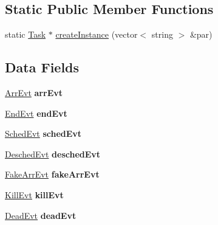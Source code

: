 \begin{DoxyCompactItemize}
\end{DoxyCompactItemize}
\subsection*{Static Public Member Functions}
\begin{DoxyCompactItemize}
\item 
static \hyperlink{classRTSim_1_1Task}{Task} $\ast$ \hyperlink{classRTSim_1_1Task_a58f3f4be461cc1347f60892675326b88}{create\+Instance} (vector$<$ string $>$ \&par)
\end{DoxyCompactItemize}
\subsection*{Data Fields}
\begin{DoxyCompactItemize}
\item 
\hyperlink{classRTSim_1_1ArrEvt}{Arr\+Evt} {\bfseries arr\+Evt}\hypertarget{classRTSim_1_1Task_a23466c1947d46a0bd6e4f602ff2ea209}{}\label{classRTSim_1_1Task_a23466c1947d46a0bd6e4f602ff2ea209}

\item 
\hyperlink{classRTSim_1_1EndEvt}{End\+Evt} {\bfseries end\+Evt}\hypertarget{classRTSim_1_1Task_a80b42caf7fec71180433321d1f7899fb}{}\label{classRTSim_1_1Task_a80b42caf7fec71180433321d1f7899fb}

\item 
\hyperlink{classRTSim_1_1SchedEvt}{Sched\+Evt} {\bfseries sched\+Evt}\hypertarget{classRTSim_1_1Task_a7d241ee11ec1b49e31da028238d26133}{}\label{classRTSim_1_1Task_a7d241ee11ec1b49e31da028238d26133}

\item 
\hyperlink{classRTSim_1_1DeschedEvt}{Desched\+Evt} {\bfseries desched\+Evt}\hypertarget{classRTSim_1_1Task_a465061168fb43b65122da9adabec47fb}{}\label{classRTSim_1_1Task_a465061168fb43b65122da9adabec47fb}

\item 
\hyperlink{classRTSim_1_1FakeArrEvt}{Fake\+Arr\+Evt} {\bfseries fake\+Arr\+Evt}\hypertarget{classRTSim_1_1Task_a3a565a492844186590398ce81b354fa8}{}\label{classRTSim_1_1Task_a3a565a492844186590398ce81b354fa8}

\item 
\hyperlink{classRTSim_1_1KillEvt}{Kill\+Evt} {\bfseries kill\+Evt}\hypertarget{classRTSim_1_1Task_a36198ed8f16c8e3f8551fe5660b57d17}{}\label{classRTSim_1_1Task_a36198ed8f16c8e3f8551fe5660b57d17}

\item 
\hyperlink{classRTSim_1_1DeadEvt}{Dead\+Evt} {\bfseries dead\+Evt}\hypertarget{classRTSim_1_1Task_a4edd7a64dccc9fe4126664f556785a19}{}\label{classRTSim_1_1Task_a4edd7a64dccc9fe4126664f556785a19}

\end{DoxyCompactItemize}
